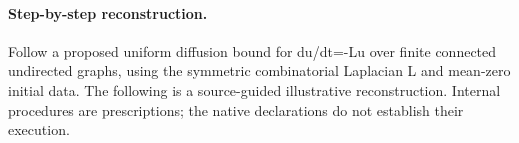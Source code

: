%
%
%
\paragraph{Step-by-step reconstruction.}
Follow a proposed uniform diffusion bound for du/dt=-Lu over finite connected undirected graphs, using the symmetric combinatorial Laplacian L and mean-zero initial data.
The following is a source-guided illustrative reconstruction. Internal procedures are prescriptions; the native declarations do not establish their execution.
